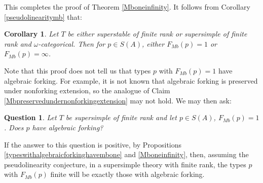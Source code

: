 \documentclass[11pt]{amsart}
\newtheorem{question}[theorem]{Question}
\newtheorem{cor}[theorem]{Corollary}
\theoremstyle{definition}
\theoremstyle{remark}
\numberwithin{equation}{section}
\begin{document}
This completes the proof of Theorem \ref{Mboneinfinity}. It follows from Corollary \ref{pseudolinearitymb} that:

\begin{cor}\label{infMb}
Let $T$ be either superstable of finite rank or supersimple of finite rank and $\omega$-categorical. Then for $p \in S(A)$, either $F_{Mb}(p)=1$ or $F_{Mb}(p) = \infty$.

\end{cor}

Note that this proof does not tell us that types $p$ with $F_{Mb}(p) = 1$ have algebraic forking. For example, it is not known that algebraic forking is preserved under nonforking extension, so the analogue of Claim \ref{Mbpreservedundernonforkingextension} may not hold.  We may then ask:

\begin{question}
Let $T$ be supersimple of finite rank and let $p \in S(A)$, $F_{Mb}(p) = 1$. Does $p$ have algebraic forking?

\end{question}



If the answer to this question is positive, by Propositions \ref{typeswithalgebraicforkinghavembone} and \ref{Mboneinfinity}, then, assuming the pseudolinearity conjecture, in a supersimple theory with finite rank, the types $p$ with $F_{Mb}(p) $ finite will be exactly those with algebraic forking.
\end{document}
